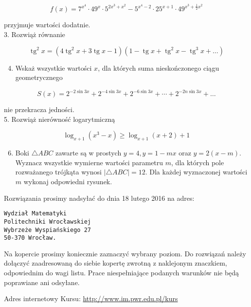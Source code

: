 \documentclass[10pt]{article}
\begin{document}
$$
f(x)=7^{x^{4}} \cdot 49^{x} \cdot 5^{2 x^{3}+x^{2}}-5^{x^{4}-2} \cdot 25^{x+1} \cdot 49^{x^{3}+\frac{1}{2} x^{2}}
$$

przyjmuje wartości dodatnie.\\
3. Rozwiąż równanie

$$
\operatorname{tg}^{2} x=\left(4 \operatorname{tg}^{2} x+3 \operatorname{tg} x-1\right)\left(1-\operatorname{tg} x+\operatorname{tg}^{2} x-\operatorname{tg}^{3} x+\ldots\right)
$$

\begin{enumerate}
  \setcounter{enumi}{3}
  \item Wskaż wszystkie wartości $x$, dla których suma nieskończonego ciągu geometrycznego
\end{enumerate}

$$
S(x)=2^{-2 \sin 3 x}+2^{-4 \sin 3 x}+2^{-6 \sin 3 x}+\cdots+2^{-2 n \sin 3 x}+\ldots
$$

nie przekracza jedności.\\
5. Rozwiąż nierówność logarytmiczną

$$
\log _{x+1}\left(x^{3}-x\right) \geqslant \log _{x+1}(x+2)+1
$$

\begin{enumerate}
  \setcounter{enumi}{5}
  \item Boki $\triangle A B C$ zawarte są w prostych $y=4, y=1-m x$ oraz $y=2(x-m)$. Wyznacz wszystkie wymierne wartości parametru $m$, dla których pole rozważanego trójkąta wynosi $|\triangle A B C|=12$. Dla każdej wyznaczonej wartości $m$ wykonaj odpowiedni rysunek.
\end{enumerate}

Rozwiązania prosimy nadsyłać do dnia 18 lutego 2016 na adres:

\begin{verbatim}
Wydział Matematyki
Politechniki Wrocławskiej
Wybrzeże Wyspiańskiego 27
50-370 Wrocław.
\end{verbatim}

Na kopercie prosimy koniecznie zaznaczyć wybrany poziom. Do rozwiązań należy dołączyć zaadresowaną do siebie kopertę zwrotną z naklejonym znaczkiem, odpowiednim do wagi listu. Prace niespełniające podanych warunków nie będą poprawiane ani odsyłane.

Adres internetowy Kursu: \href{http://www.im.pwr.edu.pl/kurs}{http://www.im.pwr.edu.pl/kurs}
\end{document}
